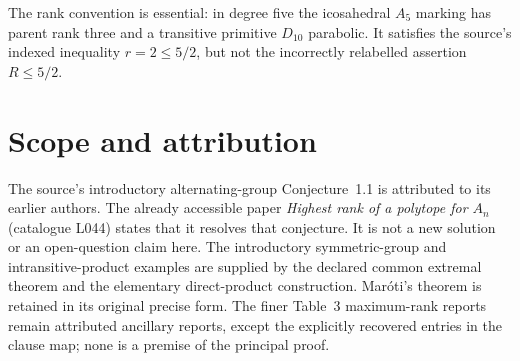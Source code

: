 \documentclass[11pt]{article}
\begin{document}
The rank convention is essential: in degree five the icosahedral
$A_5$ marking has parent rank three and a transitive primitive
$D_{10}$ parabolic. It satisfies the source's indexed inequality
$r=2\leq5/2$, but not the incorrectly relabelled assertion $R\leq5/2$.

\section{Scope and attribution}
The source's introductory alternating-group Conjecture~1.1 is attributed
to its earlier authors. The already accessible paper \emph{Highest
rank of a polytope for $A_n$} (catalogue L044) states that it resolves
that conjecture. It is not a new solution or an open-question claim here.
The introductory symmetric-group and intransitive-product examples
are supplied by the declared common extremal theorem and the elementary
direct-product construction. Mar\'oti's theorem is retained in its
original precise form. The finer Table~3 maximum-rank reports remain attributed ancillary reports,
except the explicitly recovered entries in the clause map; none is a premise
of the principal proof.
\end{document}
